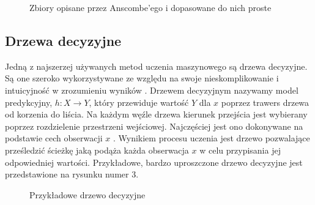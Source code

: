 \documentclass[10pt,a4paper]{article}
\begin{document}
\begin{figure}[!ht]
	\centering
	\caption{Zbiory opisane przez Anscombe'ego i dopasowane do nich proste}
\end{figure}
\FloatBarrier 
\subsection{Drzewa decyzyjne}
Jedną z najszerzej używanych metod uczenia maszynowego są drzewa decyzyjne. Są one szeroko wykorzystywane ze względu na swoje nieskomplikowanie i intuicyjność w zrozumieniu wyników \cite{wu2008top}. Drzewem decyzyjnym nazywamy model predykcyjny, $h: X \rightarrow Y$, który przewiduje wartość $Y$ dla $x$ poprzez trawers drzewa od korzenia do liścia. Na każdym węźle drzewa kierunek przejścia jest wybierany poprzez rozdzielenie przestrzeni wejściowej. Najczęściej jest ono dokonywane na podstawie cech obserwacji $x$ \cite{books/daglib/0033642}. Wynikiem procesu uczenia jest drzewo pozwalające prześledzić ścieżkę jaką podąża każda obserwacja $x$ w celu przypisania jej odpowiedniej wartości. Przykładowe, bardzo uproszczone drzewo decyzyjne jest przedstawione na rysunku numer 3.
\begin{figure}[!ht]
	\centering
	\caption{Przykładowe drzewo decyzyjne}
\end{figure}
\FloatBarrier
\end{document}
